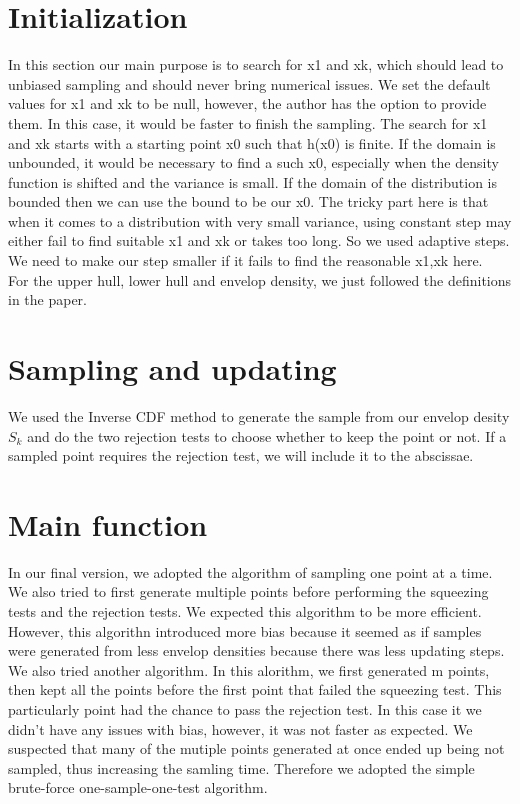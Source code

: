 \documentclass{llncs}\usepackage[]{graphicx}\usepackage[]{color}
\begin{document}
\section{Initialization}
In this section our main purpose is to search for x1 and xk, which should lead to unbiased sampling and should never bring numerical issues. We set the default values for x1 and xk to be null, however, the author has the option to provide them. In this case, it would be faster to finish the sampling. The search for x1 and xk starts with a starting point x0 such that h(x0) is finite. If the domain is unbounded, it would be necessary to find a such x0, especially when the density function is shifted and the variance is small. If the domain of the distribution is bounded then we can use the bound to be our x0. The tricky part here is that when it comes to a distribution with very small variance, using constant step may either fail to find suitable x1 and xk or takes too long. So we used adaptive steps. We need to make our step smaller if it fails to find the reasonable x1,xk here.\\
For the upper hull, lower hull and envelop density, we just followed the definitions in the paper.
\section{Sampling and updating}
We used the Inverse CDF method to generate the sample from our envelop desity $S_k$ and do the two rejection tests to choose whether to keep the point or not. If a sampled point requires the rejection test, we will include it to the abscissae.
\section{Main function}
In our final version, we adopted the algorithm of sampling one point at a time. We also tried to first generate multiple points before performing the squeezing tests and the rejection tests. We expected this algorithm to be more efficient. However, this algorithn introduced more bias because it seemed as if samples were generated from less envelop densities because there was less updating steps. We also tried another algorithm. In this alorithm, we first generated m points, then kept all the points before the first point that failed the squeezing test. This particularly point had the chance to pass the rejection test. In this case it we didn't have any issues with bias, however, it was not faster as expected. We suspected that many of the mutiple points generated at once ended up being not sampled, thus increasing the samling time. Therefore we adopted the simple brute-force one-sample-one-test algorithm.
\end{document}
